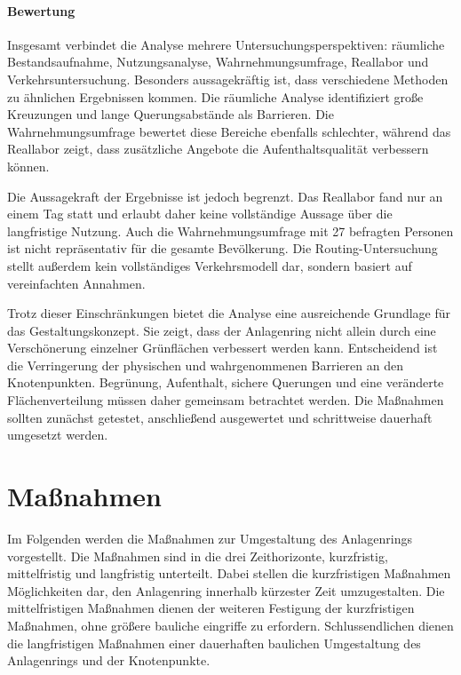 \documentclass[a4paper,12pt]{article}
\begin{document}
\paragraph{Bewertung}

Insgesamt verbindet die Analyse mehrere Untersuchungsperspektiven: räumliche Bestandsaufnahme, Nutzungsanalyse, Wahrnehmungsumfrage, Reallabor und Verkehrsuntersuchung. Besonders aussagekräftig ist, dass verschiedene Methoden zu ähnlichen Ergebnissen kommen. Die räumliche Analyse identifiziert große Kreuzungen und lange Querungsabstände als Barrieren. Die Wahrnehmungsumfrage bewertet diese Bereiche ebenfalls schlechter, während das Reallabor zeigt, dass zusätzliche Angebote die Aufenthaltsqualität verbessern können.

Die Aussagekraft der Ergebnisse ist jedoch begrenzt. Das Reallabor fand nur an einem Tag statt und erlaubt daher keine vollständige Aussage über die langfristige Nutzung. Auch die Wahrnehmungsumfrage mit 27 befragten Personen ist nicht repräsentativ für die gesamte Bevölkerung. Die Routing-Untersuchung stellt außerdem kein vollständiges Verkehrsmodell dar, sondern basiert auf vereinfachten Annahmen.

Trotz dieser Einschränkungen bietet die Analyse eine ausreichende Grundlage für das Gestaltungskonzept. Sie zeigt, dass der Anlagenring nicht allein durch eine Verschönerung einzelner Grünflächen verbessert werden kann. Entscheidend ist die Verringerung der physischen und wahrgenommenen Barrieren an den Knotenpunkten. Begrünung, Aufenthalt, sichere Querungen und eine veränderte Flächenverteilung müssen daher gemeinsam betrachtet werden. Die Maßnahmen sollten zunächst getestet, anschließend ausgewertet und schrittweise dauerhaft umgesetzt werden.




\section{Maßnahmen}
Im Folgenden werden die Maßnahmen zur Umgestaltung des Anlagenrings vorgestellt. Die Maßnahmen sind in die drei Zeithorizonte, kurzfristig, mittelfristig und langfristig unterteilt. Dabei stellen die kurzfristigen Maßnahmen Möglichkeiten dar, den Anlagenring innerhalb kürzester Zeit umzugestalten. Die mittelfristigen Maßnahmen dienen der weiteren Festigung der kurzfristigen Maßnahmen, ohne größere bauliche eingriffe zu erfordern. Schlussendlichen dienen die langfristigen Maßnahmen einer dauerhaften baulichen Umgestaltung des Anlagenrings und der Knotenpunkte.
\end{document}

